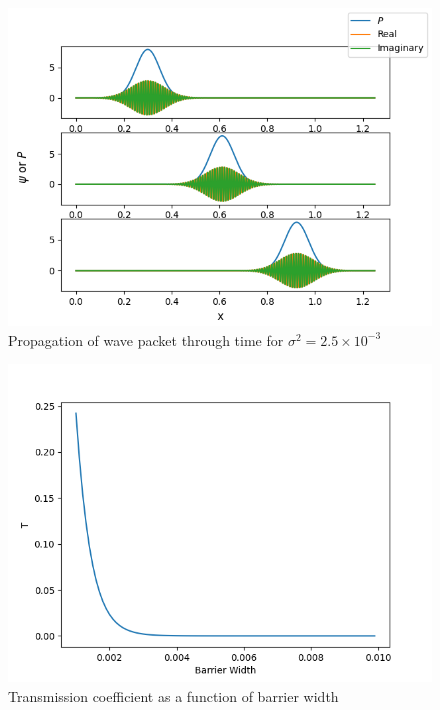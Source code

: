 \documentclass[pra,twocolumn,showpacs,amsmath,amssymb]{revtex4-2}
\begin{document}
\begin{figure}[t!]
\includegraphics[scale=0.5]{psi2_x_wo.png}
\caption{Propagation of wave packet through time for $\sigma^2 = 2.5 \times 10^{-3}$}\label{Poincare0.5}
\end{figure}

\begin{figure}[t!]
\includegraphics[scale=0.50]{t_d.png}
\caption{Transmission coefficient as a function of barrier width}\label{Poincare1}
\end{figure}
\end{document}
